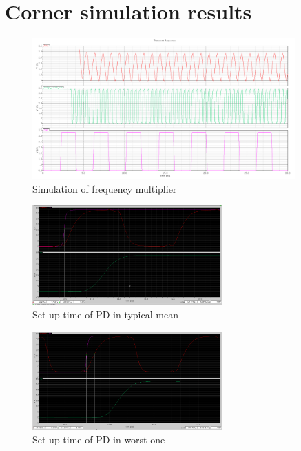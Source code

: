 \documentclass[a4paper,12pt]{article} \usepackage{graphicx}
\begin{document}
\newpage
\section{Corner simulation results}
\label{sec:corners}

\begin{figure}[h]
        \centering
        \includegraphics[width=0.9\textwidth]{../Bilder/freq_mult_layout_sim.png}
        \caption{Simulation of frequency multiplier}
        \label{fig:freq_mult_sim}
\end{figure}

\begin{figure}[h]
  \centering
  \includegraphics[width=0.65\textwidth]{../Bilder/Layout/simulations/pd_tm.png}
  \caption{Set-up time of PD in typical mean}
  \label{fig:PDtm}
\end{figure}

\begin{figure}[h]
  \centering
  \includegraphics[width=0.65\textwidth]{../Bilder/Layout/simulations/pd_wo.png}
  \caption{Set-up time of PD in worst one}
  \label{fig:PDwo}
\end{figure}
\end{document}
